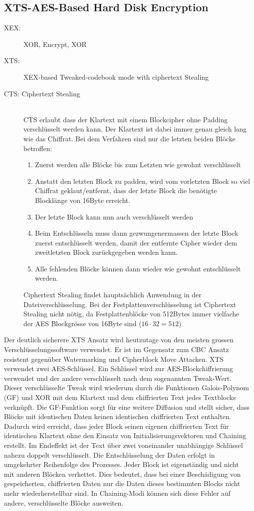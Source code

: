 \subsection{XTS-AES-Based Hard Disk Encryption}
\begin{description}
	\item[XEX:] XOR,  Encrypt, XOR
	\item[XTS:] XEX-based Tweaked-codebook mode with ciphertext Stealing
	\item[CTS: Ciphertext Stealing] \hfill \\
	CTS erlaubt dass der Klartext mit einem Blockcipher ohne Padding verschlüsselt werden kann. Der Klartext ist dabei immer genau gleich lang wie das Chiffrat. Bei dem Verfahren sind nur die letzten beiden Blöcke betroffen:
	\begin{enumerate}
		\item Zuerst werden alle Blöcke bis zum Letzten wie gewohnt verschlüsselt
		\item Anstatt den letzten Block zu padden, wird vom vorletzten Block so viel Chiffrat geklaut/entfernt, dass der letzte Block die benötigte Blocklänge von 16Byte erreicht.
		\item Der letzte Block kann nun auch verschlüsselt werden
		\item Beim Entschlüsseln muss dann gezwungenermassen der letzte Block zuerst entschlüsselt werden, damit der entfernte Cipher wieder dem zweitletzten Block zurückgegeben werden kann. 
		\item Alle fehlenden Blöcke können dann wieder wie gewohnt entschlüsselt werden.
	\end{enumerate}
	 Ciphertext Stealing findet hauptsächlich Anwendung in der Dateiverschlüsselung. Bei der Festplattenverschlüsselung ist Ciphertext Stealing nicht nötig, da Festplattenblöcke von 512Bytes immer vielfache der AES Blockgrösse von 16Byte sind ($16 \cdot 32 = 512$)
\end{description}
Der deutlich sicherere XTS Ansatz wird heutzutage von den meisten grossen Verschlüsselungssoftware verwendet. Er ist im Gegensatz zum CBC Ansatz resistent gegenüber Watermarking und Cipherblock Move Attacken. XTS verwendet zwei AES-Schlüssel. Ein Schlüssel wird zur AES-Blockchiffrierung verwendet und der andere verschlüsselt nach dem sogenannten Tweak-Wert. Dieser verschlüsselte Tweak wird wiederum durch die Funktionen Galois-Polynom (GF) und XOR mit dem Klartext und dem chiffrierten Text jedes Textblocks verknüpft. Die GF-Funktion sorgt für eine weitere Diffusion und stellt sicher, dass Blöcke mit identischen Daten keinen identischen chiffrierten Text enthalten. Dadurch wird erreicht, dass jeder Block seinen eigenen chiffrierten Text für identischen Klartext ohne den Einsatz von Initialisierungsvektoren und Chaining erstellt. Im Endeffekt ist der Text über zwei voneinander unabhängige Schlüssel nahezu doppelt verschlüsselt. Die Entschlüsselung der Daten erfolgt in umgekehrter Reihenfolge des Prozesses. Jeder Block ist eigenständig und nicht mit anderen Blöcken verkettet. Dies bedeutet, dass bei einer Beschädigung von gespeicherten, chiffrierten Daten nur die Daten dieses bestimmten Blocks nicht mehr wiederherstellbar sind. In Chaining-Modi können sich diese Fehler auf andere, verschlüsselte Blöcke ausweiten.
